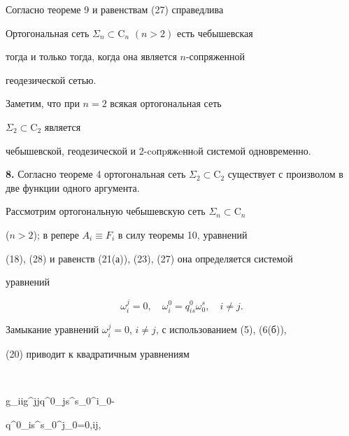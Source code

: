  


Согласно теореме 9 и равенствам (27) справедлива 


 


\begin{thm} 


Ортогональная сеть $\Sigma_n\subset\mathrm C_n$ $(n>2)$ есть чебышевская 


тогда и только тогда, когда она является $n$-сопряженной 


геодезической сетью. 


\end{thm} 


 


Заметим, что при $n=2$ всякая ортогональная сеть 


$\Sigma_2\subset\mathrm C_2$ является 


чебышевской, геодезической и 2-coпpяжeннoй системой одновременно. 


\medskip 


 


{\bf 8.} Согласно теореме 4 ортогональная сеть $\Sigma_2\subset\mathrm 


C_2$ существует с произволом в две функции одного аргумента. 


 


Рассмотрим ортогональную чебышевскую сеть $\Sigma_n\subset \mathrm C_n$ 


($n>2$); в репере $A_i\equiv F_i$ в силу теоремы 10, уравнений 


(18), (28) и равенств (21(а)), (23), (27) она определяется системой 


уравнений 


\begin{equation} 


\omega^j_i=0,\quad \omega^0_i=q^0_{is}\omega^s_0,\quad i\ne j. 


\end{equation} 


Замыкание уравнений $\omega^j_i=0$, $i\ne j$, с использованием (5), (6(б)), 


(20) приводит к квадратичным уравнениям 


$$ 


g_{ii}g^{jj}q^0_{js}\omega^s_0\wedge \omega^i_0- 


q^0_{is}\omega^s_0\wedge \omega^j_0=0,\quad i\ne j, 


